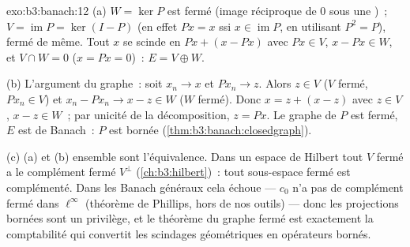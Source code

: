 \begin{solution}{exo:b3:banach:12}
(a) $W = \ker P$ est fermé (image réciproque de $0$ sous une
)~; $V = \operatorname{im}P = \ker(I -
P)$ (en effet $Px = x$ ssi $x \in \operatorname{im}P$, en
utilisant $P^2 = P$), fermé de même. Tout $x$ se scinde en
$Px + (x - Px)$ avec $Px \in V$, $x - Px \in W$, et $V \cap W
= 0$ ($x = Px = 0$)~: $E = V \oplus W$.

(b) L'argument du graphe~: soit $x_n \to x$ et $Px_n \to z$.
Alors $z \in V$ ($V$ fermé, $Px_n \in V$) et $x_n - Px_n \to
x - z \in W$ ($W$ fermé). Donc $x = z + (x - z)$ avec $z \in
V$, $x - z \in W$~; par unicité de la décomposition, $z =
Px$. Le graphe de $P$ est fermé, $E$ est de Banach~: $P$ est
bornée (\cref{thm:b3:banach:closedgraph}).

(c) (a) et (b) ensemble sont l'équivalence. Dans un espace de
Hilbert tout $V$ fermé a le complément fermé $V^\perp$
(\cref{ch:b3:hilbert})~: tout sous-espace fermé est
complémenté. Dans les Banach généraux cela échoue --- $c_0$
n'a pas de complément fermé dans $\ell^\infty$ (théorème de
Phillips, hors de nos outils) --- donc les projections
bornées sont un privilège, et le théorème du graphe fermé est
exactement la comptabilité qui convertit les scindages
géométriques en opérateurs bornés.
\end{solution}

